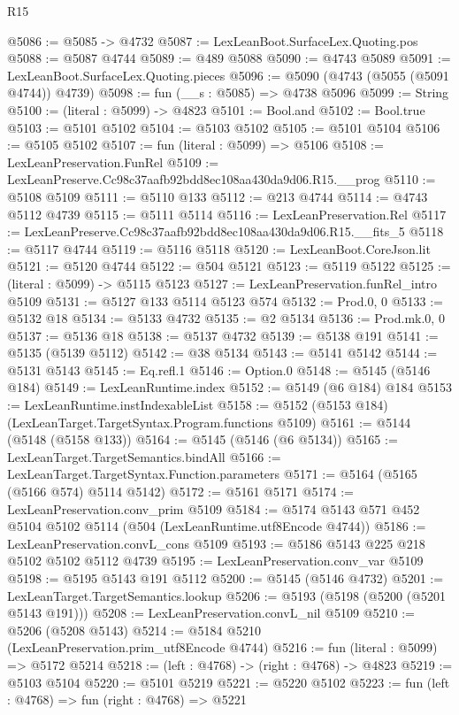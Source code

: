 \begin{lexlean}{R15}
\begin{coremodule}
{{{{{{{{{{{@5086 := @5085 -> @4732
@5087 := LexLeanBoot.SurfaceLex.Quoting.pos
@5088 := @5087 @4744
@5089 := @489 @5088
@5090 := @4743 @5089
@5091 := LexLeanBoot.SurfaceLex.Quoting.pieces
@5096 := @5090 (@4743 (@5055 (@5091 @4744)) @4739)
@5098 := fun (__s : @5085) => @4738 @5096
@5099 := String
@5100 := (literal : @5099) -> @4823
@5101 := Bool.and
@5102 := Bool.true
@5103 := @5101 @5102
@5104 := @5103 @5102
@5105 := @5101 @5104
@5106 := @5105 @5102
@5107 := fun (literal : @5099) => @5106
@5108 := LexLeanPreservation.FunRel
@5109 := LexLeanPreserve.Cc98c37aafb92bdd8ec108aa430da9d06.R15.__prog
@5110 := @5108 @5109
@5111 := @5110 @133
@5112 := @213 @4744
@5114 := @4743 @5112 @4739
@5115 := @5111 @5114
@5116 := LexLeanPreservation.Rel
@5117 := LexLeanPreserve.Cc98c37aafb92bdd8ec108aa430da9d06.R15.__fits_5
@5118 := @5117 @4744
@5119 := @5116 @5118
@5120 := LexLeanBoot.CoreJson.lit
@5121 := @5120 @4744
@5122 := @504 @5121
@5123 := @5119 @5122
@5125 := (literal : @5099) -> @5115 @5123
@5127 := LexLeanPreservation.funRel_intro @5109
@5131 := @5127 @133 @5114 @5123 @574
@5132 := Prod.{0, 0}
@5133 := @5132 @18
@5134 := @5133 @4732
@5135 := @2 @5134
@5136 := Prod.mk.{0, 0}
@5137 := @5136 @18
@5138 := @5137 @4732
@5139 := @5138 @191
@5141 := @5135 (@5139 @5112)
@5142 := @38 @5134
@5143 := @5141 @5142
@5144 := @5131 @5143
@5145 := Eq.refl.{1}
@5146 := Option.{0}
@5148 := @5145 (@5146 @184)
@5149 := LexLeanRuntime.index
@5152 := @5149 (@6 @184) @184
@5153 := LexLeanRuntime.instIndexableList
@5158 := @5152 (@5153 @184) (LexLeanTarget.TargetSyntax.Program.functions @5109)
@5161 := @5144 (@5148 (@5158 @133))
@5164 := @5145 (@5146 (@6 @5134))
@5165 := LexLeanTarget.TargetSemantics.bindAll
@5166 := LexLeanTarget.TargetSyntax.Function.parameters
@5171 := @5164 (@5165 (@5166 @574) @5114 @5142)
@5172 := @5161 @5171
@5174 := LexLeanPreservation.conv_prim @5109
@5184 := @5174 @5143 @571 @452 @5104 @5102 @5114 (@504 (LexLeanRuntime.utf8Encode @4744))
@5186 := LexLeanPreservation.convL_cons @5109
@5193 := @5186 @5143 @225 @218 @5102 @5102 @5112 @4739
@5195 := LexLeanPreservation.conv_var @5109
@5198 := @5195 @5143 @191 @5112
@5200 := @5145 (@5146 @4732)
@5201 := LexLeanTarget.TargetSemantics.lookup
@5206 := @5193 (@5198 (@5200 (@5201 @5143 @191)))
@5208 := LexLeanPreservation.convL_nil @5109
@5210 := @5206 (@5208 @5143)
@5214 := @5184 @5210 (LexLeanPreservation.prim_utf8Encode @4744)
@5216 := fun (literal : @5099) => @5172 @5214
@5218 := (left : @4768) -> (right : @4768) -> @4823
@5219 := @5103 @5104
@5220 := @5101 @5219
@5221 := @5220 @5102
@5223 := fun (left : @4768) => fun (right : @4768) => @5221
}}}}}}}}}}}
\end{coremodule}
\end{lexlean}
